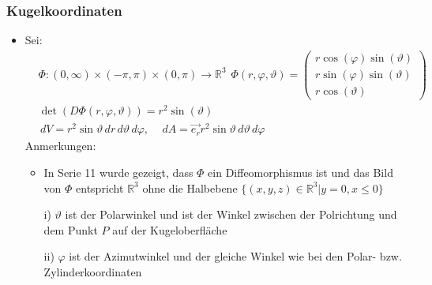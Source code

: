 \documentclass[a3paper, 11pt, landscape]{scrartcl}
\begin{document}
\begin{multicols*}{3}
	\subsubsection{Kugelkoordinaten}
		\begin{itemize}
		    \item Sei:
		\begin{align*}
			&\Phi: (0, \infty)\times (-\pi, \pi)\times (0, \pi) \rightarrow \mathbb{R}^3 \hspace{5pt} \Phi(r, \varphi, \vartheta)=
			\begin{pmatrix}
				r\cos(\varphi)\sin(\vartheta)\\
				r\sin(\varphi)\sin(\vartheta)\\ 
				r\cos(\vartheta)
			\end{pmatrix}\\
			&\det (D\Phi (r, \varphi, \vartheta))=r^2\sin(\vartheta)\\
			& \,dV = r^2 \sin{\vartheta}\,dr\,d\vartheta\,d\varphi, \quad \,dA = \vec{e_r}r^2 \sin{\vartheta}\,d\vartheta\,d\varphi
		\end{align*}
	    Anmerkungen:
		\begin{itemize}
		    \item In Serie 11 wurde gezeigt, dass $\Phi$ ein Diffeomorphismus ist und das Bild von $\Phi$ entspricht $\mathbb{R}^3$ ohne die Halbebene $\{(x,y,z)\in\mathbb{R}^3 | y=0,x\leq 0\}$
			\item[i)] $\vartheta$ ist der Polarwinkel und ist der Winkel zwischen der Polrichtung und dem Punkt $P$ auf der Kugeloberfläche
			\item[ii)] $\varphi$ ist der Azimutwinkel und der gleiche Winkel wie bei den Polar- bzw. Zylinderkoordinaten
		\end{itemize}
		\end{itemize}

\end{multicols*}
\end{document}
